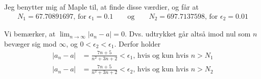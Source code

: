 \documentclass[11pt,a4paper]{article}
\newcommand{\modulus}[1]{\lvert#1\rvert}
\newcommand{\limit}[2]{\lim_{#1 \rightarrow #2}}
\begin{document}

Jeg benytter mig af Maple til, at finde disse værdier, og får at
\begin{align}
    N_1 = 67.70891697 \text{, for } \epsilon_1 = 0.1
    \qquad
    \text{og}
    \qquad
    N_2 = 697.7137598 \text{, for } \epsilon_2 = 0.01
\end{align}

Vi bemærker, at $\limit{n}{\infty} \modulus{a_n - a} = 0$. Dvs. udtrykket
går altså imod nul som $n$ bevæger sig mod $\infty$, og $0 < \epsilon_2 <
\epsilon_1$. Derfor holder
\begin{align}
    \modulus{a_n - a} &= \frac{7n + 5}{n^2 + 3n + 2} < \epsilon_1
    \text{, hvis og kun hvis } n > N_1 \\
    \modulus{a_n - a} &= \frac{7n + 5}{n^2 + 3n + 2} < \epsilon_2
    \text{, hvis og kun hvis } n > N_2
\end{align}

\end{document}
